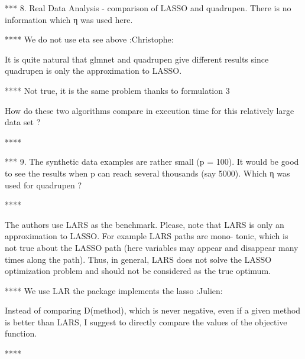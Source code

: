 \documentclass[a4paper,11pt]{texMemo}
\begin{document}
*** 8. Real Data Analysis - comparison of LASSO and quadrupen.
There is no information which η was used here. 

**** We do not use eta see above :Christophe:

It is quite natural that glmnet and quadrupen give different results since quadrupen is only the
approximation to LASSO. 

**** Not true, it is the same problem thanks to formulation 3

How do these two algorithms compare in execution time for this relatively large data set ?

**** 

*** 9. The synthetic data examples are rather small (p = 100).
It would be good to see the results when p can reach several thousands (say 5000).
 Which η was used for quadrupen ?

**** 

The authors use LARS as the benchmark.
 Please, note that LARS is only an approximation to LASSO.
 For example LARS paths are mono- tonic, 
which is not true about the LASSO path (here variables may appear and disappear many times along the path). 
Thus, in general, LARS does not solve the LASSO optimization problem and should not be considered as the true optimum.

**** We use LAR the package implements the lasso :Julien:


Instead of comparing D(method), which is never negative,
even if a given method is better than LARS, 
I suggest to directly compare the values of the objective function.


**** 


 

\end{document}
